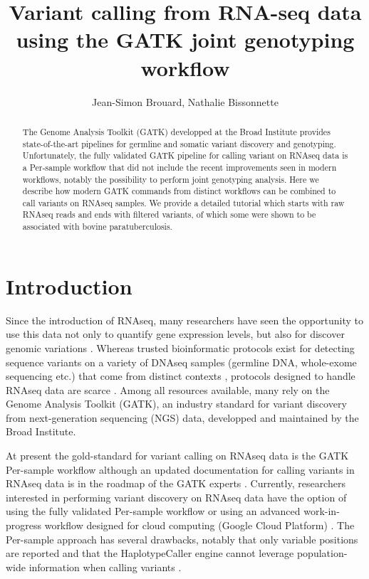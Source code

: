 \documentclass[]{article}
\title{Variant calling from RNA-seq data using the GATK joint genotyping workflow}
\author{Jean-Simon Brouard, Nathalie Bissonnette}
\begin{document}
\maketitle

\begin{abstract}
	
The Genome Analysis Toolkit (GATK) developped at the Broad Institute provides state-of-the-art pipelines for germline and somatic variant discovery and genotyping. Unfortunately, the fully validated GATK pipeline for calling variant on RNAseq data is a Per-sample workflow that did not include the recent improvements seen in modern workflows, notably the possibility to perform joint genotyping analysis. Here we describe how modern GATK commands from distinct workflows can be combined to call variants on RNAseq samples. We provide a detailed tutorial which starts with raw RNAseq reads and ends with filtered variants, of which some were shown to be associated with bovine paratuberculosis.

\end{abstract}

\section{Introduction}
Since the introduction of RNAseq, many researchers have seen the opportunity to use this data not only to quantify gene expression levels, but also for discover genomic variations \cite{Piskol2013}. Whereas trusted bioinformatic protocols exist for detecting sequence variants on a variety of DNAseq samples (germline DNA, whole-exome sequencing etc.) that come from distinct contexts \cite{Koboldt2020}, protocols designed to handle RNAseq data are scarce \cite{Piskol2013}. Among all resources available, many rely on the Genome Analysis Toolkit (GATK), an industry standard for variant discovery from next-generation sequencing (NGS) data, developped and maintained by the Broad Institute.


At present the gold-standard for variant calling on RNAseq data is the GATK Per-sample workflow although an updated documentation for calling variants in RNAseq data is in the roadmap of the GATK experts \cite{GATK_best_RNAseq}. Currently, researchers interested in performing variant discovery on RNAseq data have the option of using the fully validated Per-sample workflow \cite{GATK_RNAseq_variant_discovery} or using an advanced work-in-progress workflow designed for cloud computing (Google Cloud Platform) \cite{GATK_gatk4_rnaseq_github}. The Per-sample approach has several drawbacks, notably that only variable positions are reported and that the HaplotypeCaller engine cannot leverage population-wide information when calling variants \cite{Brouard2019, GATK_RNAseq_variant_discovery}.
\end{document}
